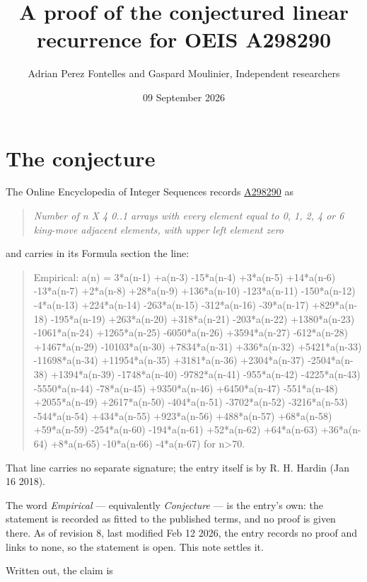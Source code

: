 \documentclass[11pt]{article}
\title{A proof of the conjectured linear recurrence for OEIS A298290}
\author{Adrian Perez Fontelles and Gaspard Moulinier, Independent researchers}
\date{09 September 2026}
\theoremstyle{definition}
\begin{document}
\maketitle
\section{The conjecture}

The Online Encyclopedia of Integer Sequences records \href{https://oeis.org/A298290}{A298290} as

\begin{quote}\itshape Number of n X 4 0..1 arrays with every element equal to 0, 1, 2, 4 or 6 king-move adjacent elements, with upper left element zero\end{quote}

and carries in its Formula section the line:

\begin{quote}\ttfamily Empirical: a(n) = 3*a(n-1) +a(n-3) -15*a(n-4) +3*a(n-5) +14*a(n-6) -13*a(n-7) +2*a(n-8) +28*a(n-9) +136*a(n-10) -123*a(n-11) -150*a(n-12) -4*a(n-13) +224*a(n-14) -263*a(n-15) -312*a(n-16) -39*a(n-17) +829*a(n-18) -195*a(n-19) +263*a(n-20) +318*a(n-21) -203*a(n-22) +1380*a(n-23) -1061*a(n-24) +1265*a(n-25) -6050*a(n-26) +3594*a(n-27) -612*a(n-28) +1467*a(n-29) -10103*a(n-30) +7834*a(n-31) +336*a(n-32) +5421*a(n-33) -11698*a(n-34) +11954*a(n-35) +3181*a(n-36) +2304*a(n-37) -2504*a(n-38) +1394*a(n-39) -1748*a(n-40) -9782*a(n-41) -955*a(n-42) -4225*a(n-43) -5550*a(n-44) -78*a(n-45) +9350*a(n-46) +6450*a(n-47) -551*a(n-48) +2055*a(n-49) +2617*a(n-50) -404*a(n-51) -3702*a(n-52) -3216*a(n-53) -544*a(n-54) +434*a(n-55) +923*a(n-56) +488*a(n-57) +68*a(n-58) +59*a(n-59) -254*a(n-60) -194*a(n-61) +52*a(n-62) +64*a(n-63) +36*a(n-64) +8*a(n-65) -10*a(n-66) -4*a(n-67) for n>70.\end{quote}

That line carries no separate signature; the entry itself is by R. H. Hardin (Jan 16 2018).

The word {\itshape Empirical} --- equivalently {\itshape Conjecture} --- is the entry's own: the statement is recorded as fitted to the published terms, and no proof is given there. As of revision 8, last modified Feb 12 2026, the entry records no proof and links to none, so the statement is open. This note settles it.

Written out, the claim is
\end{document}
